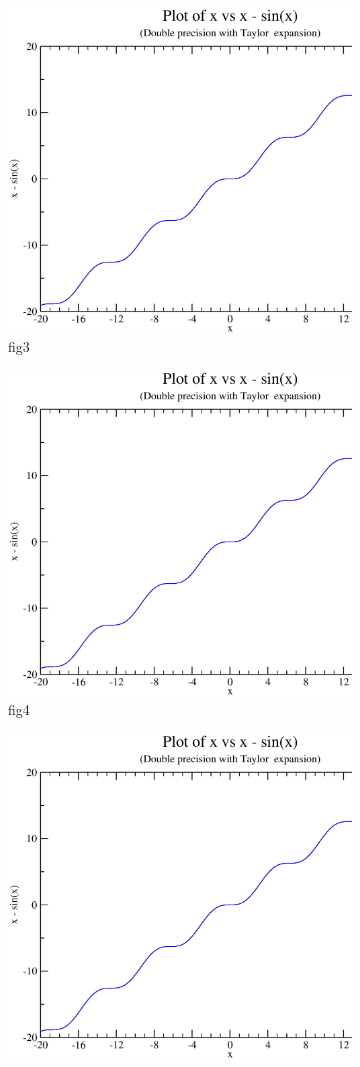 \documentclass{article}
\begin{document}
\begin{figure}[ht!]
\begin{subfigure}[b]{0.5\linewidth}
    \includegraphics[width=0.75\linewidth]{images/c.eps}
    \caption{fig3}
    \label{fig7:c}
  \end{subfigure}%
  \begin{subfigure}[b]{0.5\linewidth}
    \centering
    \includegraphics[width=0.75\linewidth]{images/d.eps}
    \caption{fig4}
    \label{fig7:d}
  \end{subfigure}
  \begin{subfigure}[b]{0.5\linewidth}
    \centering
    \includegraphics[width=0.75\linewidth]{images/d.eps}

\end{subfigure}
\end{figure}
\end{document}
